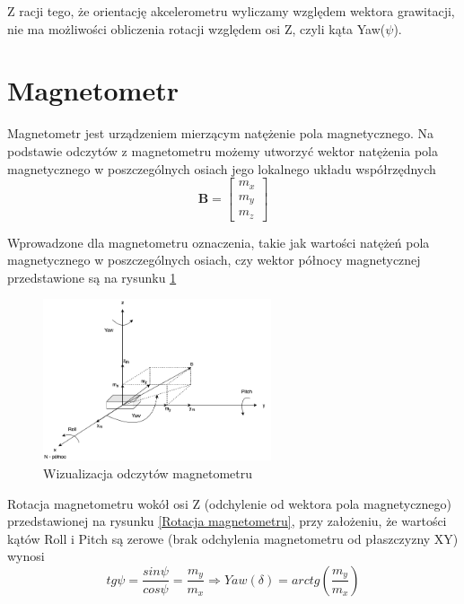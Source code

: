 Z racji tego, że orientację akcelerometru wyliczamy względem wektora grawitacji, nie ma możliwości obliczenia rotacji względem osi Z, czyli kąta Yaw($\psi$).

\section{Magnetometr}

Magnetometr jest urządzeniem mierzącym natężenie pola magnetycznego. Na podstawie odczytów z magnetometru możemy utworzyć wektor natężenia pola magnetycznego w poszczególnych osiach jego lokalnego układu współrzędnych
$$
    \mathbf{B} = 
    \left[
    \begin{array}{c}
        m_x \\
        m_y \\
        m_z
    \end{array}
    \right]
$$

Wprowadzone dla magnetometru oznaczenia, takie jak wartości natężeń pola magnetycznego w poszczególnych osiach, czy wektor północy magnetycznej przedstawione są na rysunku \ref{Magnetometr oznaczenia}

\begin{figure}[h!]
    \centering
    \includegraphics[width=0.6\textwidth]{Rysunki/Rozdzial03/Magnetometr.png}
    \caption{Wizualizacja odczytów magnetometru}
    \label{Magnetometr oznaczenia}
\end{figure}

Rotacja magnetometru wokół osi Z (odchylenie od wektora pola magnetycznego) przedstawionej na rysunku \ref{Rotacja magnetometru}, przy założeniu, że wartości kątów Roll i Pitch są zerowe (brak odchylenia magnetometru od płaszczyzny XY) wynosi
\begin{equation}
    tg\psi = \frac{sin\psi}{cos\psi} = \frac{m_y}{m_x} \Rightarrow Yaw(\delta) = arctg\left(\frac{m_y}{m_x}\right)
    \label{Odchylenie magnetometru}
\end{equation}

